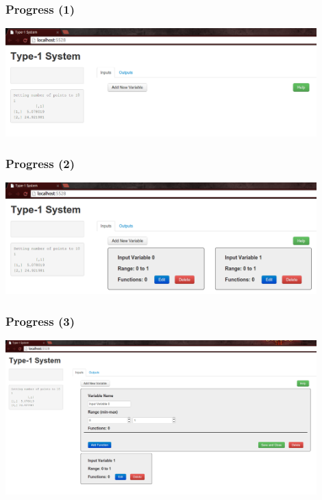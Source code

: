 \documentclass{beamer}
\begin{document}
\begin{frame}
 \frametitle{Progress (1)}
 \begin{mdframed}
 \begin{center}
 \includegraphics[width=0.9\textwidth]{images/fuz4.png}
 \end{center} 
 \end{mdframed}
\end{frame}
\begin{frame}
 \frametitle{Progress (2)}
 \begin{mdframed}
 \begin{center}
 \includegraphics[width=0.9\textwidth]{images/fuz5.png}
 \end{center} 
 \end{mdframed}
\end{frame}
\begin{frame}
 \frametitle{Progress (3)}
 \begin{mdframed}
 \begin{center}
 \includegraphics[width=0.9\textwidth]{images/fuz6.png}
 \end{center} 
 \end{mdframed}
\end{frame}
\end{document}
